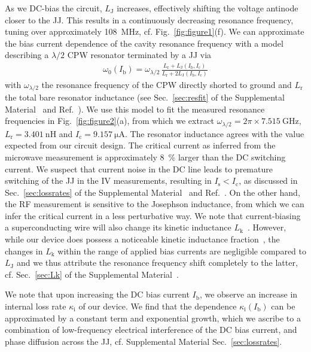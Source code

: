 % 
As we DC-bias the circuit, $L_\text{J}$ increases, effectively shifting the voltage antinode closer to the JJ.
% 
This results in a continuously decreasing resonance frequency, tuning over approximately \SI{108}{\mega\hertz}, cf. Fig.~\ref{fig:figure1}(f).
% 
We can approximate the bias current dependence of the cavity resonance frequency with a model describing a $\lambda/2$ CPW resonator terminated by a JJ via
% 
\begin{align}
\omega_0(I_\text{b})=\omega_{\lambda/2}\,\frac{L_\text{r} + L_\text{J}(I_\text{b},I_\text{c})}{L_\text{r} + 2L_\text{J}(I_\text{b},I_\text{c})}
\label{eq:f0vsI}
\end{align}
% 
with $\omega_{\lambda/2}$ the resonance frequency of the CPW directly shorted to ground and $L_\text{r}$ the total bare resonator inductance  (see Sec.~\ref{sec:resfit} of the Supplemental Material~\cite{SeeSupplementalMaterial} and Ref.~\cite{pogorzalekHystereticFluxResponse2017}).
% 
We use this model to fit the measured resonance frequencies in Fig.~\ref{fig:figure2}(a), from which we extract $\omega_{\lambda/2}=2\pi\times\SI{7.515}{\giga\hertz}$, $L_\text{r}=\SI{3.401}{\nano\henry}$ and $I_\text{c}=\SI{9.157}{\micro\ampere}$.
% 
The resonator inductance agrees with the value expected from our circuit design.
% 
The critical current as inferred from the microwave measurement is approximately \SI{8}{\percent} larger than the DC switching current.
% 
We suspect that current noise in the DC line leads to premature switching of the JJ in the IV measurements, resulting in $I_\text{s}<I_\text{c}$, as discussed in Sec.~\ref{sec:lossrates} of the Supplemental Material~\cite{SeeSupplementalMaterial} and Ref.~\cite{kautzNoiseaffectedIVCurves1990}.
% 
On the other hand, the RF measurement is sensitive to the Josephson inductance, from which we can infer the critical current in a less perturbative way.
% 
We note that current-biasing a superconducting wire will also change its kinetic inductance $L_\text{k}$~\cite{annunziataTunableSuperconductingNanoinductors2010b,vissersFrequencytunableSuperconductingResonators2015b}.
% 
However, while our device does possess a noticeable kinetic inductance fraction~\cite{gaoExperimentalStudyKinetic2006}, the changes in $L_\text{k}$ within the range of applied bias currents are negligible compared to $L_\text{J}$ and we thus attribute the resonance frequency shift completely to the latter, cf. Sec.~\ref{sec:Lk} of the Supplemental Material~\cite{SeeSupplementalMaterial}.

We note that upon increasing the DC bias current $I_\text{b}$, we observe an increase in internal loss rate $\kappa_\text{i}$ of our device.
%
We find that the dependence $\kappa_\text{i}(I_\text{b})$ can be approximated by a constant term and exponential growth, which we ascribe to a combination of low-frequency electrical interference of the DC bias current, and phase diffusion across the JJ, cf. Supplemental Material Sec.~\ref{sec:lossrates}.


